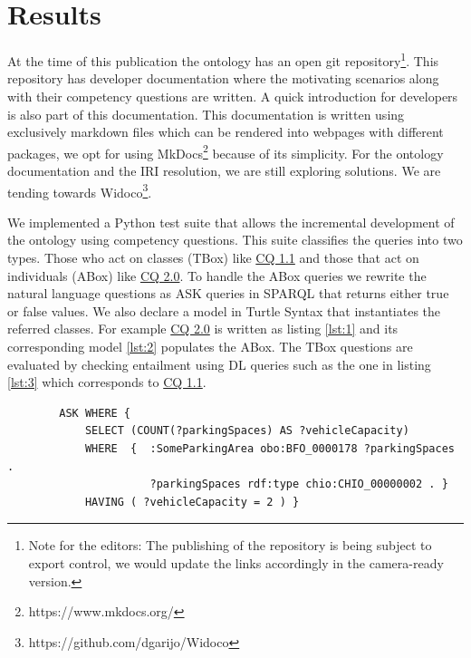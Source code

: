\section{Results}
\label{results}

At the time of this publication the ontology has an open git
repository\footnote{Note for the editors: The publishing of the repository is
being subject to export control, we would update the links accordingly in the
camera-ready version. }. This repository has developer documentation where the
motivating scenarios along with their competency questions are written. A quick
introduction for developers is also part of this documentation. This
documentation is written using exclusively markdown files which can be rendered
into webpages with different packages, we opt for using
MkDocs\footnote{https://www.mkdocs.org/} because of its simplicity. For the
ontology documentation and the IRI resolution, we are still exploring solutions.
We are tending towards Widoco\footnote{https://github.com/dgarijo/Widoco}.

We implemented a Python test suite that allows the incremental development of
the ontology using competency questions. This suite classifies the queries into
two types. Those who act on classes (TBox) like \hyperref[CQ1.1]{CQ 1.1} and
those that act on individuals (ABox) like \hyperref[CQ2.0]{CQ 2.0}. To handle
the ABox queries we rewrite the natural language questions as ASK queries in
SPARQL  that returns either true or false values. We also declare a model in
Turtle Syntax that instantiates the referred classes. For example
\hyperref[CQ2.0]{CQ 2.0} is written as listing \ref{lst:1} and its corresponding
model \ref{lst:2} populates the ABox. The TBox questions are evaluated by
checking entailment using DL queries such as the one in listing \ref{lst:3}
which corresponds to \hyperref[CQ1.1]{CQ 1.1}.

\begin{listing}[h]
    
    \begin{verbatim}
        ASK WHERE {
            SELECT (COUNT(?parkingSpaces) AS ?vehicleCapacity)  
            WHERE  {  :SomeParkingArea obo:BFO_0000178 ?parkingSpaces . 
                      ?parkingSpaces rdf:type chio:CHIO_00000002 . }
            HAVING ( ?vehicleCapacity = 2 ) }
    \end{verbatim}
    \caption{Example ABox query. (Given a parking area with two parking places) What is the (vehicle) capacity of parking lot P? (2). The namespaces are omitted.}
    \label{lst:1}
\end{listing}

